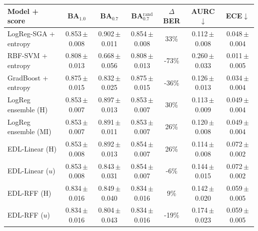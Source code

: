 \begin{tabular}{lcccccc}\toprule
Model + score & BA$_{1.0}$ & BA$_{0.7}$ & BA$_{0.7}^{\text{rand}}$ & $\Delta$BER & AURC$\downarrow$ & ECE$\downarrow$\\\midrule
LogReg-SGA + entropy & 0.853\,{\scriptsize$\pm$0.008} & 0.902\,{\scriptsize$\pm$0.011} & 0.854\,{\scriptsize$\pm$0.008} & 33\% & 0.112\,{\scriptsize$\pm$0.008} & 0.048\,{\scriptsize$\pm$0.004}\\
RBF-SVM + entropy & 0.808\,{\scriptsize$\pm$0.013} & 0.668\,{\scriptsize$\pm$0.056} & 0.808\,{\scriptsize$\pm$0.013} & -73\% & 0.260\,{\scriptsize$\pm$0.033} & 0.011\,{\scriptsize$\pm$0.005}\\
GradBoost + entropy & 0.875\,{\scriptsize$\pm$0.015} & 0.832\,{\scriptsize$\pm$0.025} & 0.875\,{\scriptsize$\pm$0.015} & -36\% & 0.126\,{\scriptsize$\pm$0.013} & 0.034\,{\scriptsize$\pm$0.004}\\
LogReg ensemble (H) & 0.853\,{\scriptsize$\pm$0.007} & 0.897\,{\scriptsize$\pm$0.013} & 0.853\,{\scriptsize$\pm$0.007} & 30\% & 0.113\,{\scriptsize$\pm$0.009} & 0.049\,{\scriptsize$\pm$0.004}\\
LogReg ensemble (MI) & 0.853\,{\scriptsize$\pm$0.007} & 0.891\,{\scriptsize$\pm$0.011} & 0.853\,{\scriptsize$\pm$0.007} & 26\% & 0.120\,{\scriptsize$\pm$0.008} & 0.049\,{\scriptsize$\pm$0.004}\\
EDL-Linear (H) & 0.853\,{\scriptsize$\pm$0.008} & 0.892\,{\scriptsize$\pm$0.013} & 0.854\,{\scriptsize$\pm$0.007} & 26\% & 0.114\,{\scriptsize$\pm$0.008} & 0.072\,{\scriptsize$\pm$0.002}\\
EDL-Linear ($u$) & 0.853\,{\scriptsize$\pm$0.008} & 0.843\,{\scriptsize$\pm$0.031} & 0.854\,{\scriptsize$\pm$0.007} & -6\% & 0.144\,{\scriptsize$\pm$0.015} & 0.072\,{\scriptsize$\pm$0.002}\\
EDL-RFF (H) & 0.834\,{\scriptsize$\pm$0.016} & 0.849\,{\scriptsize$\pm$0.040} & 0.834\,{\scriptsize$\pm$0.016} & 9\% & 0.142\,{\scriptsize$\pm$0.020} & 0.059\,{\scriptsize$\pm$0.005}\\
EDL-RFF ($u$) & 0.834\,{\scriptsize$\pm$0.016} & 0.804\,{\scriptsize$\pm$0.043} & 0.834\,{\scriptsize$\pm$0.016} & -19\% & 0.174\,{\scriptsize$\pm$0.023} & 0.059\,{\scriptsize$\pm$0.005}\\
\bottomrule\end{tabular}
